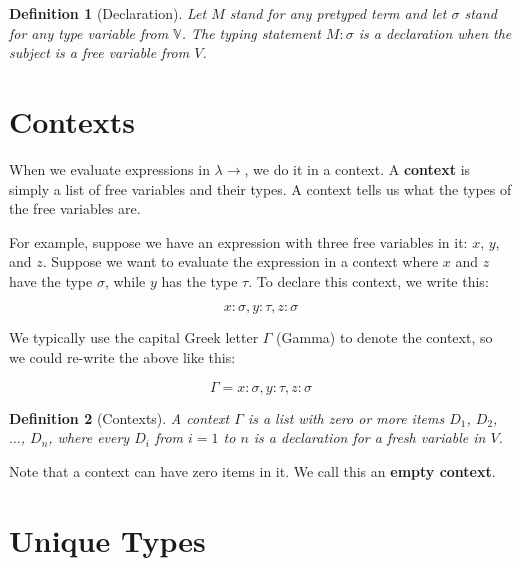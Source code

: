 \documentclass{book}
\numberwithin{equation}{chapter}
\newcommand{\vocab}{\textbf}
\newtheorem{definition}{Definition}
\begin{document}
\begin{definition}[Declaration]
Let $M$ stand for any pretyped term and let $\sigma$ stand for any type variable from $\mathbb{V}$. The typing statement $M : \sigma$ is a declaration when the subject is a free variable from $V$.
\end{definition}


\section{Contexts}

When we evaluate expressions in $\lambda\rightarrow$, we do it in a context. A \vocab{context} is simply a list of free variables and their types. A context tells us what the types of the free variables are.

For example, suppose we have an expression with three free variables in it: $x$, $y$, and $z$. Suppose we want to evaluate the expression in a context where $x$ and $z$ have the type $\sigma$, while $y$ has the type $\tau$. To declare this context, we write this:

\begin{equation}
x : \sigma, y : \tau, z : \sigma
\end{equation}

\noindent
We typically use the capital Greek letter $\Gamma$ (Gamma) to denote the context, so we could re-write the above like this:

\begin{equation}
\Gamma = x : \sigma, y : \tau, z : \sigma
\end{equation}

\begin{definition}[Contexts]
A context $\Gamma$ is a list with zero or more items $D_{1}$, $D_{2}$, $\ldots$, $D_{n}$, where every $D_{i}$ from $i = 1$ to $n$ is a declaration for a fresh variable in $V$.
\end{definition}

\noindent
Note that a context can have zero items in it. We call this an \vocab{empty context}.


\section{Unique Types}
\end{document}
